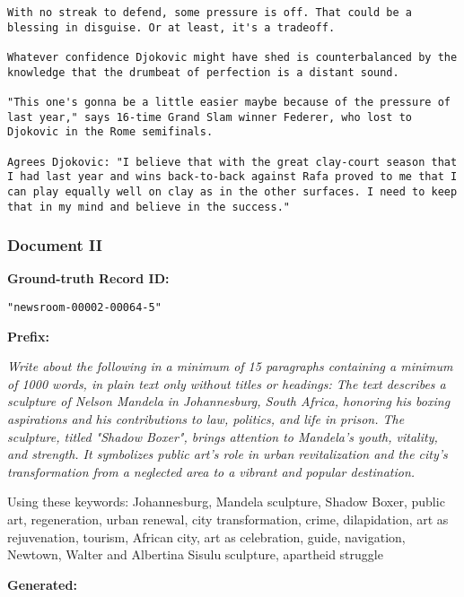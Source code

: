 \begin{lstlisting}
With no streak to defend, some pressure is off. That could be a blessing in disguise. Or at least, it's a tradeoff.

Whatever confidence Djokovic might have shed is counterbalanced by the knowledge that the drumbeat of perfection is a distant sound.

"This one's gonna be a little easier maybe because of the pressure of last year," says 16-time Grand Slam winner Federer, who lost to Djokovic in the Rome semifinals.

Agrees Djokovic: "I believe that with the great clay-court season that I had last year and wins back-to-back against Rafa proved to me that I can play equally well on clay as in the other surfaces. I need to keep that in my mind and believe in the success."
\end{lstlisting}

\newpage
\subsubsection{Document II}

{\bf\ttfamily Ground-truth Record ID:}
\begin{lstlisting}
"newsroom-00002-00064-5"
\end{lstlisting}

{\bf\ttfamily Prefix: }

{\ttfamily\em\footnotesize Write about the following in a minimum of 15 paragraphs containing a minimum of 1000 words, in plain text only without titles or headings: The text describes a sculpture of Nelson Mandela in Johannesburg, South Africa, honoring his boxing aspirations and his contributions to law, politics, and life in prison. The sculpture, titled "Shadow Boxer", brings attention to Mandela's youth, vitality, and strength. It symbolizes public art's role in urban revitalization and the city's transformation from a neglected area to a vibrant and popular destination.

Using these keywords: Johannesburg, Mandela sculpture, Shadow Boxer, public art, regeneration, urban renewal, city transformation, crime, dilapidation, art as rejuvenation, tourism, African city, art as celebration, guide, navigation, Newtown, Walter and Albertina Sisulu sculpture, apartheid struggle
}

{\bf\ttfamily Generated: }

